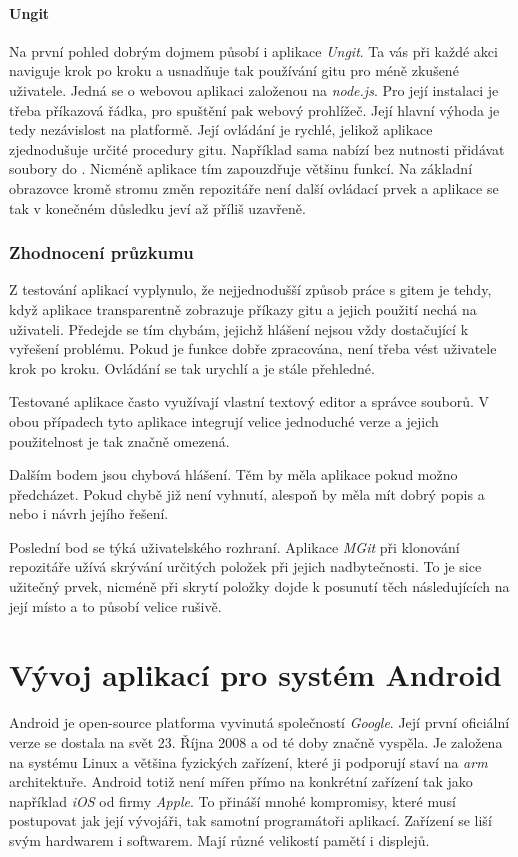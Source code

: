         \subsubsection{Ungit}
        Na první pohled dobrým dojmem působí i aplikace \emph{Ungit}. Ta vás při každé akci naviguje krok po kroku a usnadňuje tak používání gitu pro méně zkušené uživatele. Jedná se o webovou aplikaci založenou na \emph{node.js}. Pro její instalaci je třeba příkazová řádka, pro spuštění pak webový prohlížeč. Její hlavní výhoda je tedy nezávislost na platformě. Její ovládání je rychlé, jelikož aplikace zjednodušuje určité procedury gitu. Například sama nabízí  bez nutnosti přidávat soubory do . Nicméně aplikace tím zapouzdřuje většinu funkcí. Na základní obrazovce kromě stromu změn repozitáře není další ovládací prvek a aplikace se tak v konečném důsledku jeví až příliš uzavřeně.

    \subsection{Zhodnocení průzkumu}
    Z testování aplikací vyplynulo, že nejjednodušší způsob práce s gitem je tehdy, když aplikace transparentně zobrazuje příkazy gitu a jejich použití nechá na uživateli. Předejde se tím chybám, jejichž hlášení nejsou vždy dostačující k vyřešení problému. Pokud je funkce dobře zpracována, není třeba vést uživatele krok po kroku. Ovládání se tak urychlí a je stále přehledné.

    Testované aplikace často využívají vlastní textový editor a správce souborů. V obou případech tyto aplikace integrují velice jednoduché verze a jejich použitelnost je tak značně omezená.

    Dalším bodem jsou chybová hlášení. Těm by měla aplikace pokud možno předcházet. Pokud chybě již není vyhnutí, alespoň by měla mít dobrý popis a nebo i návrh jejího řešení.

    Poslední bod se týká uživatelského rozhraní. Aplikace \emph{MGit} při klonování repozitáře užívá skrývání určitých položek při jejich nadbytečnosti. To je sice užitečný prvek, nicméně při skrytí položky dojde k posunutí těch následujících na její místo a to působí velice rušivě.

\chapter{Vývoj aplikací pro systém Android}
Android je open-source platforma vyvinutá společností \emph{Google}. Její první oficiální verze se dostala na svět 23. Října 2008 a od té doby značně vyspěla. Je založena na systému Linux a většina fyzických zařízení, které ji podporují staví na \emph{arm} architektuře. Android totiž není mířen přímo na konkrétní zařízení tak jako například \emph{iOS} od firmy \emph{Apple}. To přináší mnohé kompromisy, které musí postupovat jak její vývojáři, tak samotní programátoři aplikací. Zařízení se liší svým hardwarem i softwarem. Mají různé velikostí pamětí i displejů.

